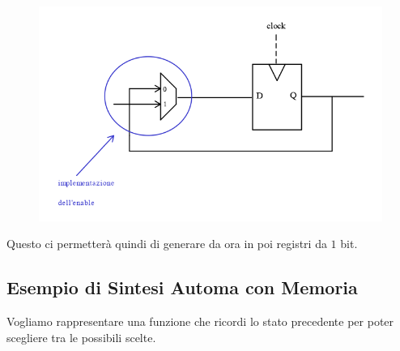 \documentclass{article}
\begin{document}
\begin{figure}[htbp]
    \includegraphics[scale=0.45]{img/enabledFlipFlop.png}
    \centering
\end{figure}

Questo ci permetterà quindi di generare da ora in poi registri da $1$ bit.

\vspace*{20px}

\subsection{Esempio di Sintesi Automa con Memoria}

Vogliamo rappresentare una funzione che ricordi lo stato precedente per poter scegliere tra le possibili scelte.

\vspace*{15px}
\end{document}
